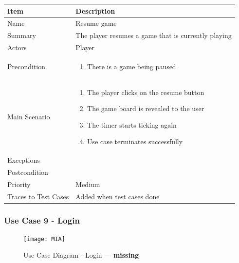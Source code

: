 \documentclass[12pt]{article}
\begin{document}
\begin{center}
\setlength{\tabcolsep}{18pt}
\renewcommand{\arraystretch}{1.3}
\begin{tabular}{ |p{3cm}|p{10cm}| }
    \hline
    \rowcolor{green}
   Item & Description \\
    \hline
    Name & Resume game \\
    \hline
    Summary & The player resumes a game that is currently playing \\
    \hline
    Actors & Player \\
    \hline
    Precondition & 
    \vspace*{-0.2in}
    \begin{enumerate}
        \item There is a game being paused
    \end{enumerate}  \\
    \hline
    Main Scenario &     
    \vspace*{-0.2in}
    \begin{enumerate}
        \item The player clicks on the resume button
        \item The game board is revealed to the user
        \item The timer starts ticking again
        \item Use case terminates successfully
    \end{enumerate}  \\
    \hline
    Exceptions &  \\
    \hline
    Postcondition & \\
    \hline
    Priority & Medium  \\
    \hline
    Traces to Test Cases & Added when test cases done  \\
    \hline
\end{tabular}
\end{center}

\newpage


\subsubsection{Use Case 9 - Login} \label{uc:9}

\begin{figure}[htbp]
    \centering
    \texttt{[image: MIA]}
    \caption{Use Case Diagram - Login --- \textbf{missing}}
    \label{fig:MIA}
\end{figure}
\end{document}
